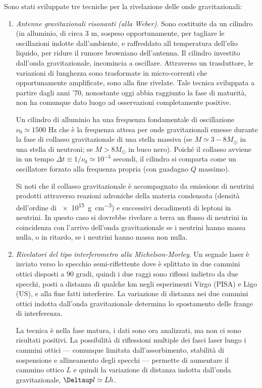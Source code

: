 Sono stati sviluppate tre tecniche per la rivelazione delle onde gravitazionali:
\begin{enumerate}
\item \emph{Antenne gravitazionali risonanti (alla Weber)}.  Sono costituite da
  un cilindro (in alluminio, di circa 3 m, sospeso opportunamente, per tagliare
  le oscillazioni indotte dall'ambiente, e raffreddato all temperatura dell'elio
  liquido, per ridure il rumore browniano dell'antenna.  Il cilindro investito
  dall'onda gravitazionale, incomincia a oscillare.  Attraverso un trasduttore,
  le variazioni di lunghezza sono trasformate in micro-correnti che
  opportunamente amplificate, sono alla fine rivelate.  Tale tecnica sviluppata
  a partire dagli anni '70, nonostante oggi abbia raggiunto la fase di maturità,
  non ha comunque dato luogo ad osservazioni completamente positive.

  Un cilindro di alluminio ha una frequenza fondamentale di oscillazione
  $\nu_0 \simeq 1500$ Hz che è la frequenza attesa per onde gravitazionali
  emesse durante la fase di collasso gravitazionale di una stella massiva (se
  $M \simeq 3-8 M_{\odot}$ in una stella di neutroni; se $M > 8 M_{\odot}$ in buco
  nero).  Poiché il collasso avviene in un tempo
  $\Delta t \equiv 1/\nu_0 \simeq 10^{-3}$ secondi, il cilindro si comparta come
  un oscillatore forzato alla frequenza propria (con guadagno $Q$ massimo).

  Si noti che il collasso gravitazionale è accompagnato da emissione di neutrini
  prodotti attraverso reazioni adroniche della materia condensata (densità
  dell'ordine di \SI{e15}{\gram \per \centi \metre \cubed}) e successivi
  decadimenti di leptoni in neutrini.  In questo caso si dovrebbe rivelare a
  terra un flusso di neutrini in coincidenza con l'arrivo dell'onda
  gravitazionale se i neutrini hanno massa nulla, o in ritardo, se i neutrini
  hanno massa non nulla.
\item \emph{Rivelatori del tipo interferometro alla Michelson-Morley}.  Un
  segnale laser è inviato verso lo specchio semi-riflettente dove è splittato in
  due cammini ottici disposti a 90 gradi, quindi i due raggi sono riflessi
  indietro da due specchi, posti a distanza di qualche km negli esperimenti
  Virgo (PISA) e Ligo (US), e alla fine fatti interferire.  La variazione di
  distanza nei due cammini ottici indotta dall'onda gravitazionale determina lo
  spostamento delle frange di interferenza.

  La tecnica è nella fase matura, i dati sono ora analizzati, ma non ci sono
  risultati positivi.  La possibilità di riflessioni multiple dei fasci laser
  lungo i cammini ottici --- comunque limitata dall'assorbimento, stabilità di
  sospensione e allineamento degli specchi --- permette di aumentare il cammino
  ottico $L$ e quindi la variazione di distanza indotta dall'onda
  gravitazionale, $\var l \simeq L h$.


\end{enumerate}
